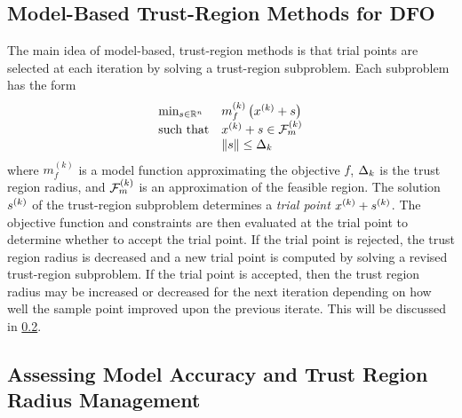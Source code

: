 \documentclass{article}
\begin{document}







\pagebreak
\subsection{Model-Based Trust-Region Methods for DFO}

The main idea of model-based, trust-region methods is that trial points are selected at each iteration by solving a trust-region subproblem.  
Each subproblem has the form 
\[ \begin{array}{ll} \min_{s \in \mathbb R^n} & m_f^{(k)}\left(x^{(k)} + s\right) \\ 
\textrm{such that} & x^{(k)}+s \in {\mathcal F_m^{(k)}} \\
& {\left\|s\right\|} \le \Delta_k
\end{array} \]
where $m_f^{(k)}$ is a model function approximating the objective $f$, $\Delta_k$ is the trust region radius,
and ${\mathcal F_m^{(k)}}$ is an approximation of the feasible region.
The solution ${{s}^{(k)}}$ of the trust-region subproblem determines a {\em trial point} $x^{(k)} + {{s}^{(k)}}$.  
The objective function and constraints are then evaluated at the trial point to determine whether to accept the trial point.
If the trial point is rejected, the trust region radius is decreased and a new trial point is computed by solving a revised trust-region subproblem.     
If the trial point is accepted, then the trust region radius may be increased or decreased for the next iteration 
depending on how well the sample point improved upon the previous iterate.
This will be discussed in \cref{rhosection}.


\subsection{Assessing Model Accuracy and Trust Region Radius Management}

\label{rhosection}
\end{document}
